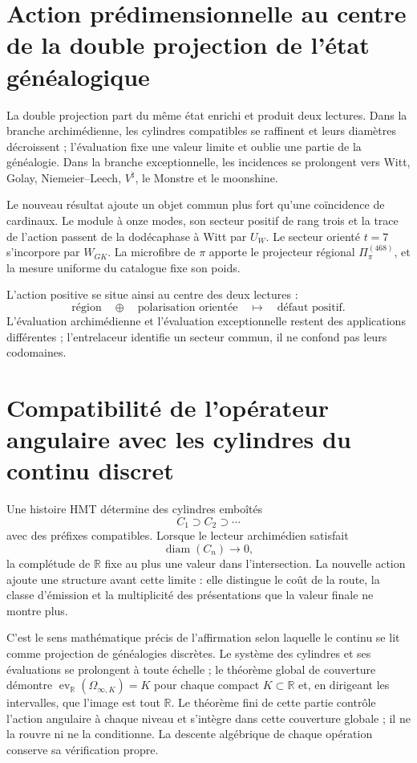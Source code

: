 \section{Action prédimensionnelle au centre de la double projection de l’état généalogique}

La double projection part du même état enrichi et produit deux
lectures. Dans la branche archimédienne, les cylindres compatibles se raffinent et
leurs diamètres décroissent ; l’évaluation fixe une valeur limite et oublie une partie
de la généalogie. Dans la branche exceptionnelle, les incidences se prolongent vers
Witt, Golay, Niemeier--Leech, \(V^\natural\), le Monstre et le moonshine.

Le nouveau résultat ajoute un objet commun plus fort qu’une coïncidence de
cardinaux. Le module à onze modes, son secteur positif de rang trois et la
trace de l’action passent de la dodécaphase à Witt par \(U_W\). Le secteur orienté
\(t=7\) s’incorpore par \(W_{GK}\). La microfibre de
\(\pi\) apporte le projecteur régional \(\Pi_\pi^{(468)}\), et la mesure uniforme du
catalogue fixe son poids.

L’action positive se situe ainsi au centre des deux lectures :
\[
 \text{région}
 \quad\oplus\quad
 \text{polarisation orientée}
 \quad\longmapsto\quad
 \text{défaut positif}.
\]
L’évaluation archimédienne et l’évaluation exceptionnelle restent des
applications différentes ; l’entrelaceur identifie un secteur commun, il ne
confond pas leurs codomaines.

\section{Compatibilité de l’opérateur angulaire avec les cylindres du continu discret}

Une histoire HMT détermine des cylindres emboîtés
\[
 C_1\supset C_2\supset\cdots
\]
avec des préfixes compatibles. Lorsque le lecteur archimédien satisfait
\[
 \operatorname{diam}(C_n)\longrightarrow0,
\]
la complétude de \(\mathbb R\) fixe au plus une valeur dans l’intersection.
La nouvelle action ajoute une structure avant cette limite : elle distingue le coût
de la route, la classe d’émission et la multiplicité des présentations que la
valeur finale ne montre plus.

C’est le sens mathématique précis de l’affirmation selon laquelle le continu se lit comme
projection de généalogies discrètes. Le système des cylindres et ses
évaluations se prolongent à toute échelle ; le théorème global de couverture
démontre
\(\operatorname{ev}_{\mathbb R}(\Omega_{\infty,K})=K\) pour chaque compact
\(K\subset\mathbb R\) et, en dirigeant les intervalles, que l’image est tout
\(\mathbb R\). Le théorème fini de cette partie contrôle l’action angulaire
à chaque niveau et s’intègre dans cette couverture globale ; il ne la rouvre ni ne la
conditionne. La descente algébrique de chaque opération conserve sa vérification
propre.

